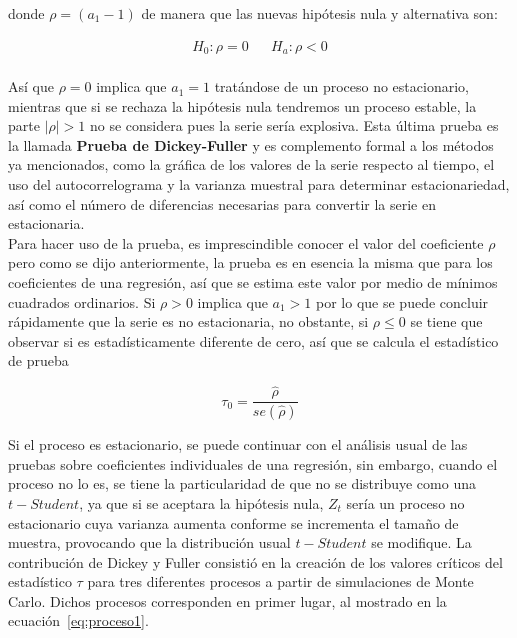donde $\rho=(a_1-1)$ de manera que las nuevas hipótesis nula y alternativa son:

   \begin{eqnarray}
    H_0: \rho=0 &  &  H_a: \rho  < 0   \\ 
    \nonumber 
   \end{eqnarray} 


 Así que $\rho=0$ implica que $a_1=1$ tratándose de un proceso no estacionario, mientras que si se rechaza la hipótesis nula tendremos un proceso estable, la parte $\left | \rho \right |>1$ no se considera pues la serie sería explosiva. Esta última prueba es la llamada \textbf{Prueba de Dickey-Fuller} y es complemento formal a los m\'etodos ya mencionados, como la gráfica de los valores de la serie respecto al tiempo, el uso del autocorrelograma y la varianza muestral para determinar estacionariedad, así como el número de diferencias necesarias para convertir la serie en estacionaria.\\
 
 Para hacer uso de la prueba, es imprescindible conocer el valor del coeficiente $\rho$ pero como se dijo anteriormente, la prueba es en esencia la misma que para los coeficientes de una regresión, así que se estima este valor por medio de mínimos cuadrados ordinarios. Si $\rho >0$ implica que $a_1>1$ por lo que se puede concluir rápidamente que la serie es no estacionaria, no obstante, si $\rho \leq 0$ se tiene que observar si es estadísticamente diferente de cero, así que se calcula el estadístico de prueba
 
 \begin{equation}
 \tau_0=\frac{\hat{\rho}}{se(\hat{\rho})}
 \end{equation}
 
Si el proceso es estacionario, se puede continuar con el análisis usual de las pruebas sobre coeficientes individuales de una regresión, sin embargo, cuando el proceso no lo es, se tiene la particularidad de que no se distribuye como una $t-Student$, ya que si se aceptara la hipótesis nula, $Z_t$ sería un proceso no estacionario cuya varianza aumenta conforme se incrementa el tamaño de muestra, provocando que la distribución usual $t-Student$ se modifique. La contribución de Dickey y Fuller consistió en la creación de los valores críticos del estadístico $\tau$ para tres diferentes procesos  a partir de simulaciones de Monte Carlo. Dichos procesos corresponden en primer lugar, al mostrado en la ecuación~\ref{eq:proceso1}. \\

